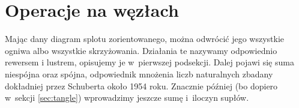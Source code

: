 
\section{Operacje na węzłach}
Mając dany diagram splotu zorientowanego, można odwrócić jego wszystkie ogniwa albo wszystkie skrzyżowania.
Działania te nazywamy odpowiednio rewersem i lustrem, opisujemy je w~pierwszej podsekcji.
Dalej pojawi się suma niespójna oraz spójna, odpowiednik mnożenia liczb naturalnych zbadany dokładniej przez Schuberta około 1954 roku. 
Znacznie później (bo dopiero w~sekcji \ref{sec:tangle}) wprowadzimy jeszcze sumę i~iloczyn supłów.








